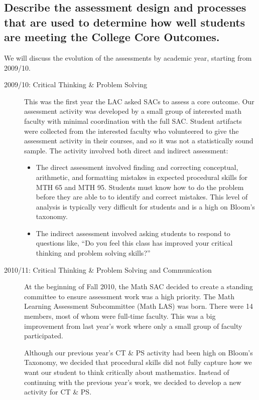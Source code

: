 \subsection[Core outcome assessment design and process]{Describe the assessment design and processes that are used to
determine how well students are meeting the College Core Outcomes.}
We will discuss the evolution of the assessments by academic year, starting 
from 2009/10.
\begin{description}
\item [2009/10: Critical Thinking  \& Problem Solving]

This was the first year the LAC asked SACs to assess a core outcome. Our
assessment activity was developed by a small group of interested math faculty
with minimal coordination with the full SAC. Student artifacts were collected from the interested faculty who volunteered to give the assessment activity in their courses, and so it was not a statistically sound sample.  The activity involved both direct and
indirect assessment: 
\begin{itemize}
\item The direct assessment involved finding and correcting conceptual,
  arithmetic, and formatting mistakes in expected procedural skills for MTH 65
  and MTH 95. Students must know how to do the problem before they are able to
  to identify and correct mistakes. This level of analysis is typically very
  difficult for students and is a high on Bloom's taxonomy.

\item The indirect assessment involved asking students to respond to questions
  like, ``Do you feel this class has improved your critical thinking and problem
  solving skills?''
\end{itemize}

\item[2010/11:  Critical Thinking \& Problem Solving and Communication]

At the beginning of Fall 2010, the Math SAC decided to create a standing
committee to ensure assessment work was a high priority. The Math Learning
Assessment Subcommittee (Math LAS) was born.  There were 14 members, most of
whom were full-time faculty. This was a big improvement from last year's work
where only a small group of faculty participated.

Although our previous year's CT \& PS activity had been high on Bloom's
Taxonomy, we decided that procedural skills did not fully capture how we want
our student to think critically about mathematics.  Instead of continuing with
the previous year's work, we decided to develop a new activity for CT \& PS. 


\end{description}
